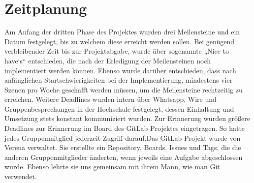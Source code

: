 \section{Zeitplanung}
Am Anfang der dritten Phase des Projektes wurden drei Meilensteine und ein Datum festgelegt, bis zu welchem diese erreicht werden sollen. Bei genügend verbleibender Zeit bis zur Projektabgabe, wurde über sogenannte „Nice to have‘s“ entschieden, die nach der Erledigung der Meilensteinen noch implementiert werden können. Ebenso wurde darüber entschieden, dass nach anfänglichen Startschwierigkeiten bei der Implementierung, mindestens vier Szenen pro Woche geschafft werden müssen, um die Meilensteine rechtzeitig zu erreichen. Weitere Deadlines wurden intern über Whatsapp, Wire und Gruppenbesprechungen in der Hochschule festgelegt, dessen Einhaltung und Umsetzung stets konstant kommuniziert wurden. 
Zur Erinnerung wurden größere Deadlines zur Erinnerung im Board des GitLab Projektes eingetragen. So hatte jedes Gruppenmitglied jederzeit Zugriff darauf.\newpage Das GitLab-Projekt wurde von Verena verwaltet. Sie erstellte ein Repository, Boards, Issues und Tags, die die anderen Gruppenmitglieder änderten, wenn jeweils eine Aufgabe abgeschlossen wurde. Ebenso lehrte sie uns gemeinsam mit ihrem Mann, wie man Git verwendet.